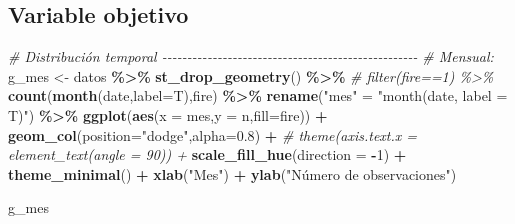 \documentclass[12pt,a4paper,]{book}
\newenvironment{Shaded}{\begin{snugshade}}{\end{snugshade}}
\newcommand{\AttributeTok}[1]{\textcolor[rgb]{0.13,0.29,0.53}{#1}}
\newcommand{\CommentTok}[1]{\textcolor[rgb]{0.56,0.35,0.01}{\textit{#1}}}
\newcommand{\DecValTok}[1]{\textcolor[rgb]{0.00,0.00,0.81}{#1}}
\newcommand{\FloatTok}[1]{\textcolor[rgb]{0.00,0.00,0.81}{#1}}
\newcommand{\FunctionTok}[1]{\textcolor[rgb]{0.13,0.29,0.53}{\textbf{#1}}}
\newcommand{\NormalTok}[1]{#1}
\newcommand{\OtherTok}[1]{\textcolor[rgb]{0.56,0.35,0.01}{#1}}
\newcommand{\SpecialCharTok}[1]{\textcolor[rgb]{0.81,0.36,0.00}{\textbf{#1}}}
\newcommand{\StringTok}[1]{\textcolor[rgb]{0.31,0.60,0.02}{#1}}
\numberwithin{dummy}{section}
\theoremstyle{ocrenumbox}
\theoremstyle{blacknumex}
\theoremstyle{blacknumbox}
\theoremstyle{ocrenum}
\theoremstyle{ocrenum}
\begin{document}
\hypertarget{variable-objetivo}{%
\subsection{Variable objetivo}\label{variable-objetivo}}

\begin{Shaded}
\begin{Highlighting}[]
\CommentTok{\# Distribución temporal {-}{-}{-}{-}{-}{-}{-}{-}{-}{-}{-}{-}{-}{-}{-}{-}{-}{-}{-}{-}{-}{-}{-}{-}{-}{-}{-}{-}{-}{-}{-}{-}{-}{-}{-}{-}{-}{-}{-}{-}{-}{-}{-}{-}{-}{-}{-}{-}{-}{-}{-}}
\CommentTok{\# Mensual:}
\NormalTok{g\_mes }\OtherTok{\textless{}{-}}\NormalTok{ datos }\SpecialCharTok{\%\textgreater{}\%} 
  \FunctionTok{st\_drop\_geometry}\NormalTok{() }\SpecialCharTok{\%\textgreater{}\%} 
  \CommentTok{\# filter(fire==1) \%\textgreater{}\% }
  \FunctionTok{count}\NormalTok{(}\FunctionTok{month}\NormalTok{(date,}\AttributeTok{label=}\NormalTok{T),fire) }\SpecialCharTok{\%\textgreater{}\%} 
  \FunctionTok{rename}\NormalTok{(}\StringTok{"mes"} \OtherTok{=} \StringTok{"month(date, label = T)"}\NormalTok{) }\SpecialCharTok{\%\textgreater{}\%} 
  \FunctionTok{ggplot}\NormalTok{(}\FunctionTok{aes}\NormalTok{(}\AttributeTok{x =}\NormalTok{ mes,}\AttributeTok{y =}\NormalTok{ n,}\AttributeTok{fill=}\NormalTok{fire)) }\SpecialCharTok{+}
  \FunctionTok{geom\_col}\NormalTok{(}\AttributeTok{position=}\StringTok{"dodge"}\NormalTok{,}\AttributeTok{alpha=}\FloatTok{0.8}\NormalTok{) }\SpecialCharTok{+}
  \CommentTok{\# theme(axis.text.x = element\_text(angle = 90)) +}
  \FunctionTok{scale\_fill\_hue}\NormalTok{(}\AttributeTok{direction =} \SpecialCharTok{{-}}\DecValTok{1}\NormalTok{) }\SpecialCharTok{+}
  \FunctionTok{theme\_minimal}\NormalTok{() }\SpecialCharTok{+}
  \FunctionTok{xlab}\NormalTok{(}\StringTok{"Mes"}\NormalTok{) }\SpecialCharTok{+}
  \FunctionTok{ylab}\NormalTok{(}\StringTok{"Número de observaciones"}\NormalTok{)}

\NormalTok{g\_mes}


\end{Highlighting}
\end{Shaded}
\end{document}
